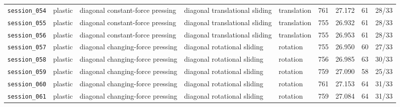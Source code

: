 \documentclass[UTF8,a4paper,11pt]{ctexart}
\begin{document}
\begin{longtable}{lp{1.55cm}p{2.7cm}p{2.65cm}lrrrr}
\texttt{session\_054} & plastic & diagonal constant-force pressing & diagonal translational sliding & translation & 761 & 27.172 & 61 & 28/33 \\
\texttt{session\_055} & plastic & diagonal constant-force pressing & diagonal translational sliding & translation & 755 & 26.932 & 61 & 28/33 \\
\texttt{session\_056} & plastic & diagonal constant-force pressing & diagonal translational sliding & translation & 755 & 26.953 & 61 & 28/33 \\
\texttt{session\_057} & plastic & diagonal changing-force pressing & diagonal rotational sliding & rotation & 755 & 26.950 & 60 & 27/33 \\
\texttt{session\_058} & plastic & diagonal changing-force pressing & diagonal rotational sliding & rotation & 756 & 26.985 & 63 & 30/33 \\
\texttt{session\_059} & plastic & diagonal changing-force pressing & diagonal rotational sliding & rotation & 759 & 27.090 & 58 & 25/33 \\
\texttt{session\_060} & plastic & diagonal changing-force pressing & diagonal rotational sliding & rotation & 761 & 27.153 & 64 & 31/33 \\
\texttt{session\_061} & plastic & diagonal changing-force pressing & diagonal rotational sliding & rotation & 759 & 27.084 & 64 & 31/33 \\
\bottomrule
\end{longtable}
\end{document}
